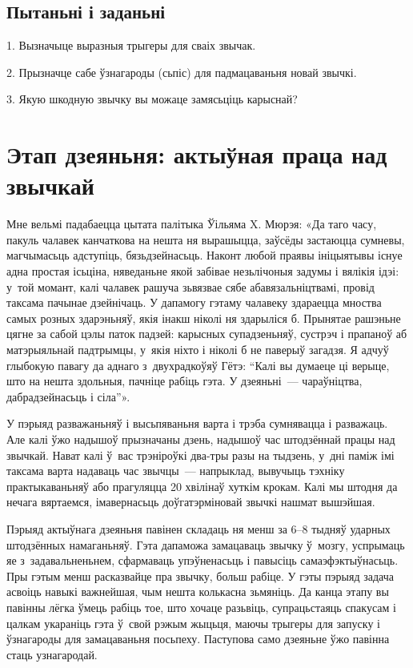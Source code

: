 \subsection*{Пытаньні і заданьні}

1. Вызначыце выразныя трыгеры для сваіх звычак.

2. Прызначце сабе ўзнагароды (сьпіс) для падмацаваньня новай звычкі.

3. Якую шкодную звычку вы можаце замясьціць карыснай?


\section{Этап дзеяньня: актыўная праца над звычкай}

Мне вельмі падабаецца цытата палітыка Ўільяма X. Мюрэя: «Да таго часу, пакуль чалавек канчаткова на нешта ня вырашыцца, заўсёды застаюцца сумневы, магчымасьць адступіць, бязьдзейнасьць. Наконт любой праявы ініцыятывы існуе адна простая ісьціна, няведаньне якой забівае незьлічоныя задумы і вялікія ідэі: у~той момант, калі чалавек рашуча зьвязвае сябе абавязальніцтвамі, провід таксама пачынае дзейнічаць. У дапамогу гэтаму чалавеку здараецца мноства самых розных здарэньняў, якія інакш ніколі ня здарыліся б. Прынятае рашэньне цягне за сабой цэлы паток падзей: карысных супадзеньняў, сустрэч і прапаноў аб матэрыяльнай падтрымцы, у~якія ніхто і ніколі б не паверыў загадзя. Я адчуў глыбокую павагу да аднаго з~двухрадкоўяў Гётэ: ``Калі вы думаеце ці верыце, што на нешта здольныя, пачніце рабіць гэта. У дзеяньні~--- чараўніцтва, дабрадзейнасьць і сіла''».

У пэрыяд разважаньняў і высьпяваньня варта і трэба сумнявацца і разважаць. Але калі ўжо надышоў прызначаны дзень, надышоў час штодзённай працы над звычкай. Нават калі ў~вас трэніроўкі два-тры разы на тыдзень, у~дні паміж імі таксама варта надаваць час звычцы~--- напрыклад, вывучыць тэхніку практыкаваньняў або прагуляцца 20 хвілінаў хуткім крокам. Калі мы штодня да нечага вяртаемся, імавернасьць доўгатэрміновай звычкі нашмат вышэйшая.

Пэрыяд актыўнага дзеяньня павінен складаць ня менш за 6--8 тыдняў ударных штодзённых намаганьняў. Гэта дапаможа замацаваць звычку ў~мозгу, успрымаць яе з~задавальненьнем, сфармаваць упэўненасьць і павысіць самаэфэктыўнасьць. Пры гэтым менш расказвайце пра звычку, больш рабіце. У гэты пэрыяд задача асвоіць навыкі важнейшая, чым нешта колькасна зьмяніць. Да канца этапу вы павінны лёгка ўмець рабіць тое, што хочаце разьвіць, супрацьстаяць спакусам і цалкам укараніць гэта ў~свой рэжым жыцьця, маючы трыгеры для запуску і ўзнагароды для замацаваньня посьпеху. Паступова само дзеяньне ўжо павінна стаць узнагародай.

